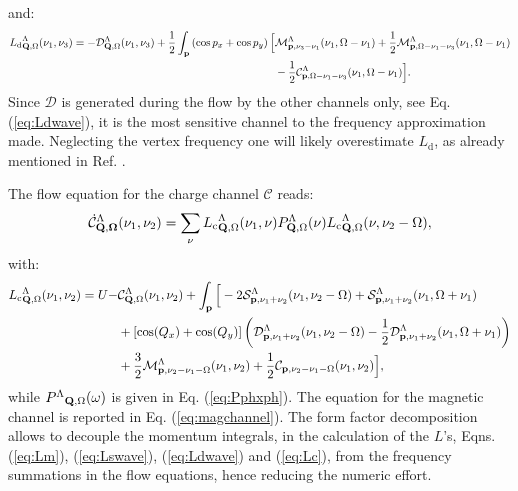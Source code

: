 and: 
\begin{align} 
\label{eq:Ldwave}
{L_\mathrm{d}}^{\Lambda}_{\mathbf{Q},\Omega}(\nu_1,\nu_3) = -\mathcal{D}^{\Lambda}_{\mathbf{Q},\Omega}(\nu_1,\nu_3) 
+ \frac{1}{2}\int_{\mathbf{p}} \left(\cos{p_x}+\cos{p_y}\right) \Big[ 
& \mathcal{M}^{\Lambda}_{\mathbf{p},\nu_3-\nu_1}(\nu_1,\Omega-\nu_1) 
+ \frac{1}{2} \mathcal{M}^{\Lambda}_{\mathbf{p},\Omega-\nu_1-\nu_3}(\nu_1,\Omega-\nu_1) \\
&- \frac{1}{2} \mathcal{C}^{\Lambda}_{\mathbf{p},\Omega-\nu_1-\nu_3}(\nu_1,\Omega-\nu_1) \Big].
\end{align}	 
Since $\mathcal{D}$ is generated during the flow by the other channels only, see Eq. (\ref{eq:Ldwave}), it is the most sensitive channel to the frequency approximation made.  
Neglecting the vertex frequency one will likely overestimate $L_{\mathrm{d}}$, as already mentioned in Ref. .

The flow equation for the charge channel $\mathcal{C}$ reads:
\begin{equation}
\dot{\mathcal{C}}^{\Lambda}_{\mathbf{Q,\Omega}}(\nu_1,\nu_2) = \sum_{\nu}{L_\mathrm{c}}^{\Lambda}_{\mathbf{Q},\Omega} (\nu_1,\nu) P^{\Lambda}_{\mathbf{Q},\Omega}(\nu) 
{L_\mathrm{c}}^{\Lambda}_{\mathbf{Q},\Omega} (\nu,\nu_2-\Omega), 
\end{equation} 	   
with: 
 \begin{align} 
 \label{eq:Lc}
{L_\mathrm{c}}^{\Lambda}_{\mathbf{Q},\Omega}(\nu_1,\nu_2)=U-&\mathcal{C}^{\Lambda}_{\mathbf{Q},\Omega}(\nu_1,\nu_2)
+ \int_{\mathbf{p}} \Big [
- 2 \mathcal{S}^{\Lambda}_{\mathbf{p},\nu_1+\nu_2}(\nu_1,\nu_2-\Omega) + \mathcal{S}^{\Lambda}_{\mathbf{p},\nu_1+\nu_2}(\nu_1,\Omega+\nu_1)
\\ &+  [\cos(Q_x)+\cos(Q_y)]\left( \mathcal{D}^{\Lambda}_{\mathbf{p},\nu_1+\nu_2}(\nu_1,\nu_2-\Omega) -\frac{1}{2} \mathcal{D}^{\Lambda}_{\mathbf{p},\nu_1+\nu_2}(\nu_1,\Omega+\nu_1) \right)
\\ &+ \frac{3}{2} \mathcal{M}^{\Lambda}_{\mathbf{p},\nu_2-\nu_1-\Omega}(\nu_1,\nu_2)
+ \frac{1}{2} \mathcal{C}_{\mathbf{p},\nu_2-\nu_1-\Omega}(\nu_1,\nu_2) \Big],
\end{align}
while ${P^{\Lambda}}_{\mathbf{Q},\Omega}(\omega)$ is given in Eq. (\ref{eq:Pphxph}).
The equation for the magnetic channel is reported in Eq. (\ref{eq:magchannel}).
The form factor decomposition allows to decouple the momentum integrals, in the calculation of the $L$'s, Eqns. (\ref{eq:Lm}), (\ref{eq:Lswave}), (\ref{eq:Ldwave}) and (\ref{eq:Lc}), from the frequency summations in the flow equations, hence reducing the numeric effort.   	 


